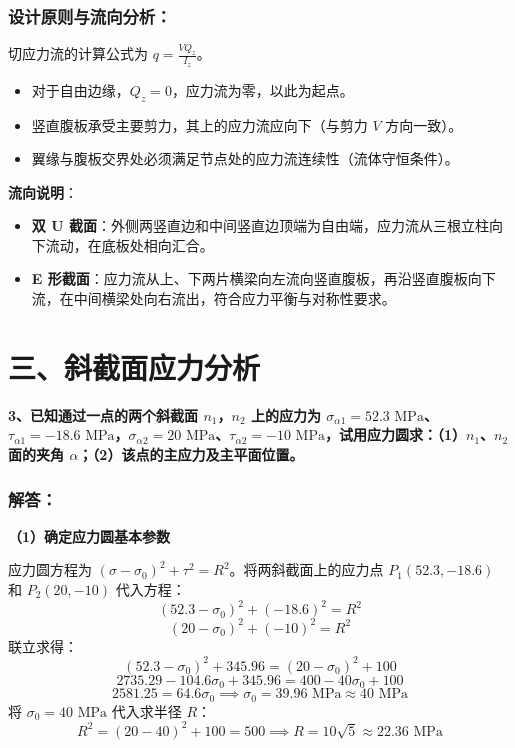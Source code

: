 \documentclass[UTF8,fontset=windows]{ctexart}
\begin{document}
\subsubsection*{设计原则与流向分析：}
切应力流的计算公式为 $q = \frac{V Q_z}{I_z}$。
\begin{itemize}
    \item 对于自由边缘，$Q_z = 0$，应力流为零，以此为起点。
    \item 竖直腹板承受主要剪力，其上的应力流应向下（与剪力 $V$ 方向一致）。
    \item 翼缘与腹板交界处必须满足节点处的应力流连续性（流体守恒条件）。
\end{itemize}
\textbf{流向说明}：
\begin{itemize}
    \item \textbf{双 U 截面}：外侧两竖直边和中间竖直边顶端为自由端，应力流从三根立柱向下流动，在底板处相向汇合。
    \item \textbf{E 形截面}：应力流从上、下两片横梁向左流向竖直腹板，再沿竖直腹板向下流，在中间横梁处向右流出，符合应力平衡与对称性要求。
\end{itemize}

\newpage

\section*{三、斜截面应力分析}

\textbf{3、已知通过一点的两个斜截面 $n_1$，$n_2$ 上的应力为 $\sigma_{\alpha 1}=52.3\text{ MPa}$、$\tau_{\alpha 1}=-18.6\text{ MPa}$，$\sigma_{\alpha 2}=20\text{ MPa}$、$\tau_{\alpha 2}=-10\text{ MPa}$，试用应力圆求：（1）$n_1$、$n_2$ 面的夹角 $\alpha$；（2）该点的主应力及主平面位置。}

\subsubsection*{解答：}

\textbf{（1）确定应力圆基本参数}

应力圆方程为 $(\sigma - \sigma_0)^2 + \tau^2 = R^2$。将两斜截面上的应力点 $P_1(52.3, -18.6)$ 和 $P_2(20, -10)$ 代入方程：
\[
    (52.3 - \sigma_0)^2 + (-18.6)^2 = R^2
\]
\[
    (20 - \sigma_0)^2 + (-10)^2 = R^2
\]
联立求得：
\[
    (52.3 - \sigma_0)^2 + 345.96 = (20 - \sigma_0)^2 + 100
\]
\[
    2735.29 - 104.6 \sigma_0 + 345.96 = 400 - 40 \sigma_0 + 100
\]
\[
    2581.25 = 64.6 \sigma_0 \implies \sigma_0 = 39.96\text{ MPa} \approx 40\text{ MPa}
\]
将 $\sigma_0 = 40\text{ MPa}$ 代入求半径 $R$：
\[
    R^2 = (20 - 40)^2 + 100 = 500 \implies R = 10\sqrt{5} \approx 22.36\text{ MPa}
\]
\end{document}
